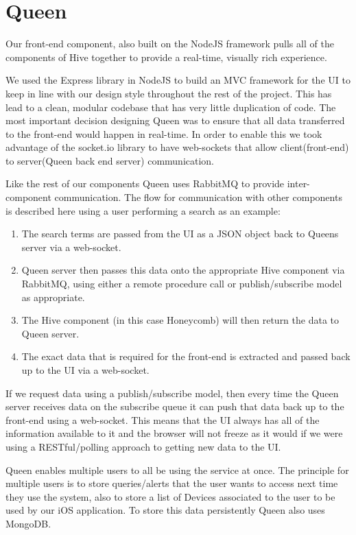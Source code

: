 \section{Queen}

Our front-end component, also built on the NodeJS framework pulls all of the
components of Hive together to provide a real-time, visually rich experience.

We used the Express\cite{express} library in NodeJS to build an MVC framework for the UI
to
keep in line with our design style throughout the rest of the project. This has
lead to a clean, modular codebase that has very little duplication of code.
The most important decision designing Queen was to ensure that all data
transferred to the front-end would happen in real-time. In order to enable this
we took advantage of the socket.io\cite{socket} library to have web-sockets that allow
client(front-end) to server(Queen back end server) communication.

Like the rest of our components Queen uses RabbitMQ to provide inter-component
communication. The flow for communication with other components is described
here
using a user performing a search as an example:

\begin{enumerate}
  \item The search terms are passed from the UI as a JSON object back to
  Queens
  server via a web-socket.
  \item Queen server then passes this data onto the appropriate Hive
  component
  via RabbitMQ, using either a remote procedure call or
  publish/subscribe model
  as appropriate.
  \item The Hive component (in this case Honeycomb) will then
  return the data to
  Queen server.
  \item The exact data that is required for the
  front-end is extracted and
  passed back up to the UI via a web-socket.
\end{enumerate}

If we request data using a publish/subscribe model, then
every time the Queen
server receives data on the subscribe queue it can push
that data back up to the
front-end using a web-socket. This means that the UI
always has all of the
information available to it and the browser will not
freeze as it would if we
were using a RESTful/polling approach to getting new
data to the UI.

Queen enables multiple users to all be using the service
at once. The principle
for multiple users is to store queries/alerts that the
user wants to access next
time they use the system, also to store a list of
Devices associated to the user
to be used by our iOS application. To store this data
persistently Queen also uses
MongoDB.

